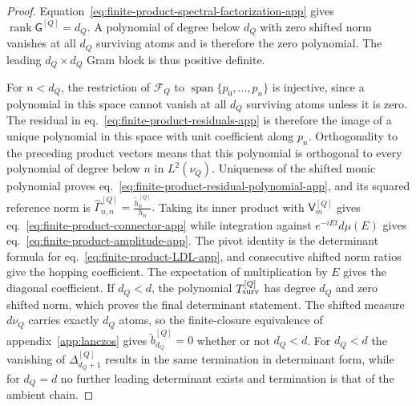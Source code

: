 \documentclass[a4paper,11pt]{article}
\def\dd{d}%
\def\ii{i}%
\def\ee{e}%
\theoremstyle{definition}
\theoremstyle{remark}
\newcommand{\dd}{\mathrm d}
\newcommand{\ii}{\mathrm i}
\newcommand{\ee}{\mathrm e}
\newcommand{\cF}{\mathcal F}
\newcommand{\Span}{\operatorname{span}}
\newcommand{\rank}{\operatorname{rank}}
\newcommand{\thh}{\widetilde h}
\begin{document}
\begin{proof}
Equation~\eqref{eq:finite-product-spectral-factorization-app} gives
$\rank\mathsf G^{[Q]}=d_Q$.  A polynomial of degree below $d_Q$ with
zero shifted norm vanishes at all $d_Q$ surviving atoms and is therefore
the zero polynomial.  The leading $d_Q\times d_Q$ Gram block is thus
positive definite.

For $n<d_Q$, the restriction of $\cF_Q$ to
$\Span\{p_0,\ldots,p_n\}$ is injective, since a polynomial in this
space cannot vanish at all $d_Q$ surviving atoms unless it is zero.
The residual in eq.~\eqref{eq:finite-product-residuals-app} is therefore
the image of a unique polynomial in this space with unit coefficient
along $p_n$.  Orthogonality to the preceding product vectors means that
this polynomial is orthogonal to every polynomial of degree below $n$
in $L^2(\nu_Q)$.
Uniqueness of the shifted monic polynomial proves
eq.~\eqref{eq:finite-product-residual-polynomial-app}, and its squared
reference norm is
$
   \widehat\Gamma_{n,n}^{[Q]}
   =\frac{\thh_n^{[Q]}}{h_n}.
$
Taking its inner product with $\mathsf V_m^{[Q]}$ gives
eq.~\eqref{eq:finite-product-connector-app} while integration against
$\ee^{-\ii Et}\dd\mu(E)$ gives
eq.~\eqref{eq:finite-product-amplitude-app}.  The pivot identity is the
determinant formula for eq.~\eqref{eq:finite-product-LDL-app}, and
consecutive shifted norm ratios give the hopping coefficient.  The
expectation of multiplication by $E$ gives the diagonal coefficient.
If $d_Q<d$, the polynomial $T_{\rm surv}^{[Q]}$ has degree $d_Q$ and
zero shifted norm, which proves the final determinant statement. The shifted measure $\dd\nu_Q$ carries exactly $d_Q$ atoms, so the finite-closure equivalence of appendix~\ref{app:lanczos} gives $\widetilde b_{d_Q}^{[Q]}=0$ whether or not $d_Q<d$.  For $d_Q<d$ the vanishing of $\Delta_{d_Q+1}^{[Q]}$ results in the same termination in determinant form, while for $d_Q=d$ no further leading determinant exists and termination is that of the ambient chain.
\end{proof}
\end{document}
